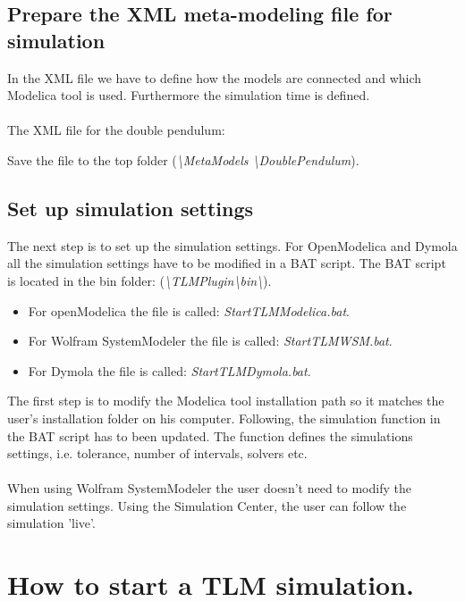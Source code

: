 \subsection{Prepare the XML meta-modeling file for simulation }
In the XML file we have to define how the models are connected and which Modelica tool is used. Furthermore the simulation time is defined.\\\\The XML file for the double pendulum: ~\\

Save the file to the top folder (\textit{\textbackslash MetaModels \textbackslash DoublePendulum}).

\subsection{Set up simulation settings}
The next step is to set up the simulation settings. For OpenModelica and Dymola all the simulation settings have to be modified in a BAT script. The BAT script is located in the bin folder: (\textit{\textbackslash TLMPlugin\textbackslash bin\textbackslash}).


\begin{itemize}
  \item For openModelica the file is called: \textit{StartTLMModelica.bat}.
  \item For Wolfram SystemModeler the file is called: \textit{StartTLMWSM.bat}.
  \item For Dymola the file is called: \textit{StartTLMDymola.bat}.
\end{itemize}

The first step is to modify the Modelica tool installation path so it matches the user's installation folder on his computer. Following, the simulation function in the BAT script has to been updated. The function defines the simulations settings, i.e. tolerance, number of intervals, solvers etc. \\\\When using Wolfram SystemModeler the user doesn't need to modify the simulation settings. Using the Simulation Center, the user can follow the simulation 'live'.

\section{How to start a TLM simulation.}

